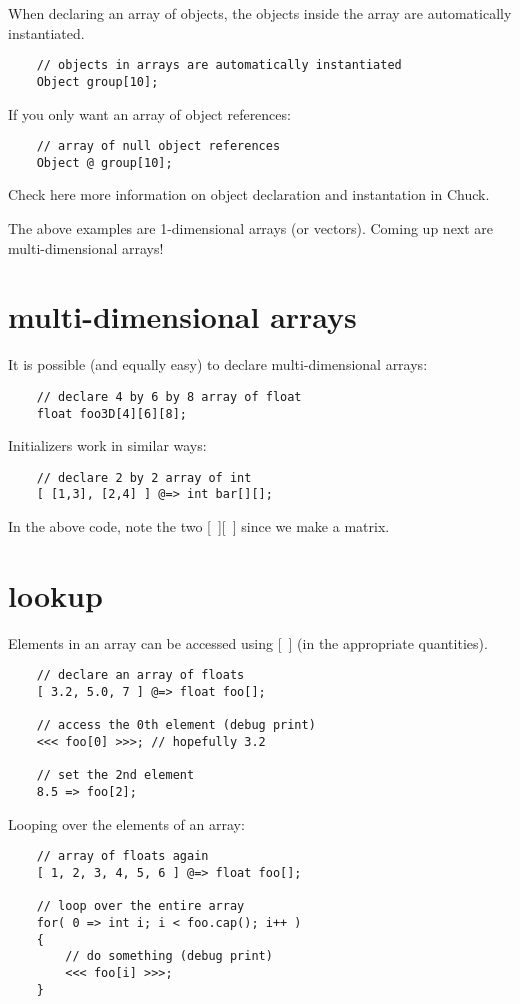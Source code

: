 When declaring an array of objects, the objects inside the array are automatically instantiated.
\begin{verbatim}
    // objects in arrays are automatically instantiated
    Object group[10];
\end{verbatim}

If you only want an array of object references:
\begin{verbatim}
    // array of null object references
    Object @ group[10];
\end{verbatim}
Check here more information on object declaration and instantation in Chuck.

The above examples are 1-dimensional arrays (or vectors). Coming up next are multi-dimensional arrays!
 

\section{multi-dimensional arrays}

It is possible (and equally easy) to declare multi-dimensional arrays:
\begin{verbatim}
    // declare 4 by 6 by 8 array of float
    float foo3D[4][6][8];
\end{verbatim}

Initializers work in similar ways:
\begin{verbatim}
    // declare 2 by 2 array of int
    [ [1,3], [2,4] ] @=> int bar[][];
\end{verbatim}
 In the above code, note the two [~][~] since we make a matrix.
 

\section{lookup}

Elements in an array can be accessed using [~] (in the appropriate quantities).
\begin{verbatim}
    // declare an array of floats
    [ 3.2, 5.0, 7 ] @=> float foo[];

    // access the 0th element (debug print)
    <<< foo[0] >>>; // hopefully 3.2

    // set the 2nd element
    8.5 => foo[2];
\end{verbatim}

Looping over the elements of an array:
\begin{verbatim}
    // array of floats again
    [ 1, 2, 3, 4, 5, 6 ] @=> float foo[];

    // loop over the entire array
    for( 0 => int i; i < foo.cap(); i++ )
    {
        // do something (debug print)
        <<< foo[i] >>>;
    }
\end{verbatim}

